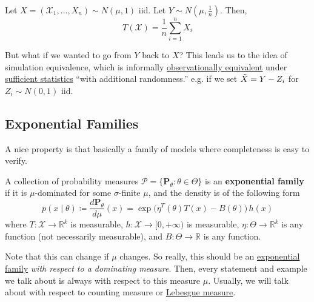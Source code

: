   \begin{example}
    \label{ex:model-equivalence-under-sufficiency}
    Let $X = (\mathcal{X}_1, \ldots, X_n) \sim N(\mu, 1)$ iid. Let $Y \sim N(\mu, \frac{1}{n})$. Then, 
    \begin{equation}
      T(\mathcal{X}) = \frac{1}{n} \sum_{i=1}^n X_i
    \end{equation}
  \end{example}

  But what if we wanted to go from $Y$ back to $X$? This leads us to the idea of simulation equivalence, which is informally \hyperref[def:observationally-equivalent]{observationally equivalent} under \hyperref[def:sufficient-statistic]{sufficient statistics} ``with additional randomness.'' e.g. if we set $\Tilde{X} = Y - Z_i$ for $Z_i \sim N(0, 1)$ iid. 

\subsection{Exponential Families} 

  A nice property is that basically a family of models where completeness is easy to verify. 

  \begin{definition}
    \label{def:exponential-family}
    A collection of probability measures $\mathcal{P} = \{\mathbf{P}_\theta \colon \theta \in \Theta\}$ is an \textbf{exponential family} if it is $\mu$-dominated for some $\sigma$-finite $\mu$, and the density is of the following form 
    \begin{equation}
      p(x \mid \theta) \coloneqq \frac{d \mathbf{P}_\theta}{d \mu} (x) = \exp \big( \eta^T (\theta) T(x) - B(\theta) \big) \, h(x)
    \end{equation}
    where $T: \mathcal{X} \to \mathbb{R}^k$ is measurable, $h: \mathcal{X} \to [0, +\infty)$ is measurable, $\eta: \Theta \to \mathbb{R}^k$ is any function (not necessarily measurable), and $B : \Theta \to \mathbb{R}$ is any function. 
  \end{definition}

  Note that this can change if $\mu$ changes. So really, this should be an \hyperref[def:exponential-family]{exponential family} \textit{with respect to a dominating measure}. Then, every statement and example we talk about is always with respect to this measure $\mu$. Usually, we will talk about with respect to counting measure or \hyperref[mt-def:lebesgue-measure]{Lebesgue measure}.  

